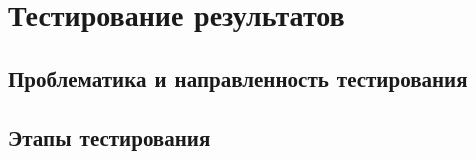 \section{Тестирование результатов}

\subsection{Проблематика и направленность тестирования}

\subsection{Этапы тестирования}
